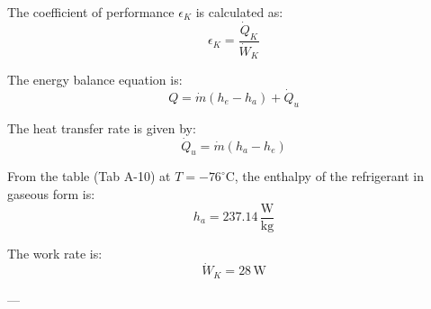 The coefficient of performance \( \epsilon_K \) is calculated as:  
\[
\epsilon_K = \frac{\dot{Q}_K}{\dot{W}_K}
\]

The energy balance equation is:  
\[
Q = \dot{m}(h_e - h_a) + \dot{Q}_u
\]

The heat transfer rate is given by:  
\[
\dot{Q}_u = \dot{m}(h_a - h_e)
\]

From the table (Tab A-10) at \( T = -76^\circ \text{C} \), the enthalpy of the refrigerant in gaseous form is:  
\[
h_a = 237.14 \, \frac{\text{W}}{\text{kg}}
\]

The work rate is:  
\[
\dot{W}_K = 28 \, \text{W}
\]

---